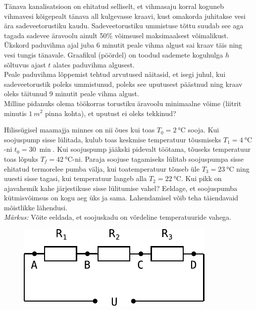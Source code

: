 \documentclass[10pt]{article}
\begin{document}

Tänava kanalisatsioon on ehitatud selliselt, et vihmasaju korral koguneb vihmavesi kõigepealt tänava all kulgevasse kraavi, kust omakorda juhitakse vesi ära sadeveetorustiku kaudu. Sadeveetorustiku ummistuse tõttu suudab see aga tagada sadevee äravoolu ainult 50\% võimsusel maksimaalsest võimalikust. Ükskord paduvihma ajal juba 6 minutit peale vihma algust sai kraav täis ning vesi tungis tänavale. Graafikul (pöördel) on toodud sademete koguhulga $h$ sõltuvus ajast $t$ alates paduvihma algusest. \\
Peale paduvihma lõppemist tehtud arvutused näitasid, et isegi juhul, kui sadeveetorustik poleks ummistunud, poleks see uputusest päästnud ning kraav oleks täitunud 9 minutit peale vihma algust.\\
Milline pidanuks olema töökorras torustiku äravoolu minimaalne võime (liitrit minutis $\SI{1} {m^2}$ pinna kohta), et uputust ei oleks tekkinud?
\probend
\bigskip


Hilissügisel maamajja minnes on nii õues kui toas $T_0=\SI {2}{\celsius}$ sooja. Kui soojuspump sisse lülitada, kulub toas keskmise temperatuur  tõusmiseks $T_1=\SI {4}{\celsius}$-ni $t_0=\SI{30}{\min}$. Kui soojuspump jääkski pidevalt töötama, tõuseks temperatuur toas lõpuks $T_f=\SI {42}{\celsius}$-ni. Paraja soojuse tagamiseks lülitab soojuspumpa sisse ehitatud termorelee pumba välja, kui toatemperatuur tõuseb üle $T_3=\SI{23}\celsius$ ning uuesti sisse tagasi, kui temperatuur langeb alla $T_2=\SI{22}{\celsius}$. Kui pikk on ajavahemik kahe järjestikuse sisse lülitumise vahel? Eeldage, et soojuspumba kütmisvõimsus on kogu aeg üks ja sama. Lahendamisel võib teha täiendavaid mõistlikke lähendusi.\\ \emph{Märkus:} Võite eeldada, et soojuskadu on võrdeline temperatuuride vahega.
\probend
\bigskip


\begin{figure}
  \begin{center}
    \includegraphics[width=1\linewidth]{2023-v2g-07-yl.pdf}
  \end{center}
  \vspace{-2em}
\end{figure}
\end{document}
